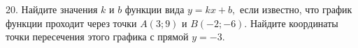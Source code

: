 20. Найдите значения $k$ и $b$ функции вида $y=kx+b,$ если известно, что график функции проходит через точки $A(3;9)$ и $B(-2;-6).$ Найдите координаты точки пересечения этого графика с прямой $y=-3.$\\
